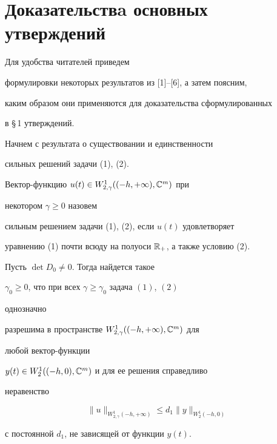  


\section{Доказательствa основных утверждений} 


 





Для удобства читателей приведем


формулировки некоторых результатов из [1]--[6], а затем поясним, 


каким образом они применяются для доказательства сформулированных 


в \S\,1 утверждений. 


 


Начнем с результата о существовании и единственности 


сильных решений задачи (1), (2). 


 


\begin{defn} 


Вектор-функцию $u(t)\in


W^{1}_{2,\gamma}((-h,+\infty),\Bbb C^m)$ при 


некотором $\gamma\ge0$ назовем 


сильным решением задачи (1), (2), если $u(t)$ удовлетворяет 


уравнению (1) почти всюду на полуоси $\Bbb R_+$, а также условию (2). 


\end{defn} 


 


\begin{lem} 


Пусть $\det D_0\ne0$. Тогда найдется такое 


$\gamma_0\ge0$, что при всех $\gamma\ge\gamma_0$ задача $(1)$, $(2)$ 


однозначно 


разрешима в пространстве $W^{1}_{2,\gamma}((-h,+\infty),\Bbb C^m)$ для 


любой вектор-функции 


$y(t)\in W^{1}_{2}((-h,0),\Bbb C^m)$ и для ее решения справедливо 


неравенство 


$$ 


\|u\|_{W^{1}_{2,\gamma}(-h,+\infty)}\le d_1\|y\|_{W^1_2(-h,0)} 


$$ 


с постоянной $d_1$, не зависящей от функции $y(t)$. 


\end{lem} 


